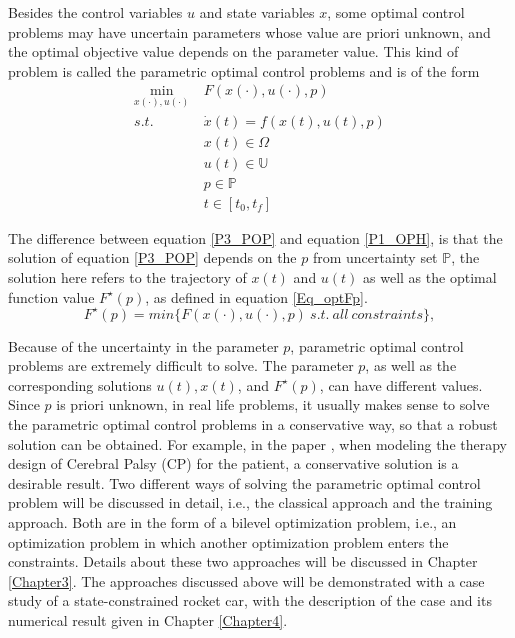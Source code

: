 \documentclass  [
  paper    = a4,
  BCOR     = 10mm,
  twoside,
  fontsize = 12pt,
  fleqn,
  toc      = bibnumbered,
  toc      = listofnumbered,
  numbers  = noendperiod,
  headings = normal,
  listof   = leveldown,
  version  = 3.03
]                                       {scrreprt}
\newcommand{\<}{\langle}
\renewcommand{\>}{\rangle}
\begin{document}
Besides the control variables $u$ and state variables $x$, some optimal control problems may have uncertain parameters whose value are priori unknown, and the optimal objective value depends on the parameter value. This kind of problem is called the parametric optimal control problems and is of the form 
      \begin{equation}
	\begin{aligned}
	\underset{x(\cdot), u(\cdot)}{\text{min}}  \ &  F(x(\cdot), u(\cdot), p) \\
	s.t.\ \  &  \dot{x} (t) = f(x(t), u(t),p)\\ 
	& x(t) \in \Omega \\
	& u(t) \in \mathbb{U}  \\
	& p  \in   \mathbb{P}  \\
	& t \in [t_0, t_f]
\end{aligned}
\label{P3_POP}
\end{equation}
  
The difference between equation \ref{P3_POP} and equation  \ref{P1_OPH}, is that the solution of equation \ref{P3_POP} depends on the $p$ from uncertainty set $ \mathbb{P}$, the solution here refers to the trajectory of $x(t)$ and $u(t)$ as well as the optimal function value $F^\star(p)$, as defined in equation \ref{Eq_optFp}.
\begin{equation}
	F^\star(p) = min \{ F(x(\cdot), u(\cdot), p) \ s.t. \  all \ constraints\},
	\label{Eq_optFp}
\end{equation}	

Because of the uncertainty in the parameter $p$, parametric optimal control problems are extremely difficult to solve. The parameter $p$, as well as the corresponding solutions $u(t), x(t)$, and $F^\star(p)$, can have different values. Since $p$ is priori unknown, in real life problems, it usually makes sense to solve the parametric optimal control problems in a conservative way, so that a robust solution can be obtained. For example, in the paper \cite{MatSch22}, when modeling the therapy design of Cerebral Palsy (CP) for the patient, a conservative solution is a desirable result. Two different ways of solving the parametric optimal control problem will be discussed in detail, i.e., the classical approach and the training approach. Both are in the form of a bilevel optimization problem, i.e., an optimization problem in which another optimization problem enters the constraints. Details about these two approaches will be discussed in Chapter \ref{Chapter3}. The approaches discussed above will be demonstrated with a case study of a state-constrained rocket car, with the description of the case and its numerical result given in Chapter \ref{Chapter4}.
\end{document}
